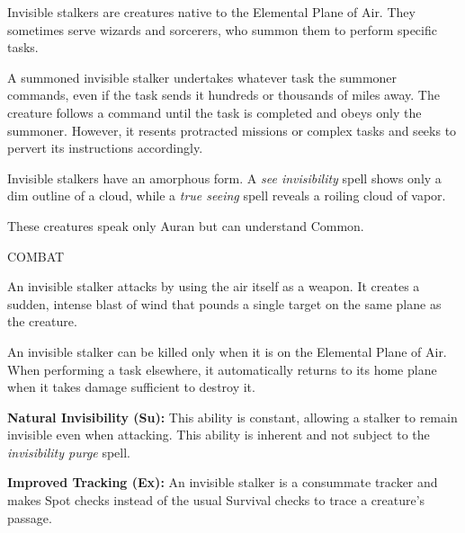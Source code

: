 \documentclass{article}
\begin{document}
Invisible stalkers are creatures native to the Elemental Plane of Air. They sometimes 
serve wizards and sorcerers, who summon them to perform specific tasks.

A summoned invisible stalker undertakes whatever task the summoner commands, even 
if the task sends it hundreds or thousands of miles away. The creature follows 
a command until the task is completed and obeys only the summoner. However, it 
resents protracted missions or complex tasks and seeks to pervert its instructions 
accordingly.

Invisible stalkers have an amorphous form. A \textit{see invisibility }spell shows 
only a dim outline of a cloud, while a \textit{true seeing }spell reveals a roiling 
cloud of vapor.

These creatures speak only Auran but can understand Common.

COMBAT

An invisible stalker attacks by using the air itself as a weapon. It creates a 
sudden, intense blast of wind that pounds a single target on the same plane as 
the creature.

An invisible stalker can be killed only when it is on the Elemental Plane of Air. 
When performing a task elsewhere, it automatically returns to its home plane when 
it takes damage sufficient to destroy it.

\textbf{Natural Invisibility (Su):} This ability is constant, allowing a stalker 
to remain invisible even when attacking. This ability is inherent and not subject 
to the \textit{invisibility purge }spell.

\textbf{Improved Tracking (Ex):} An invisible stalker is a consummate tracker and 
makes Spot checks instead of the usual Survival checks to trace a creature's passage.

\newpage
\end{document}
